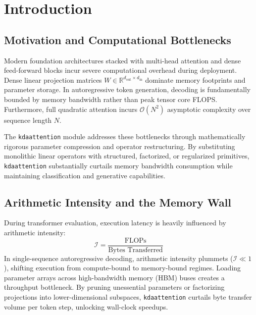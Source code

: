 \section{Introduction}

\subsection{Motivation and Computational Bottlenecks}
Modern foundation architectures stacked with multi-head attention and dense feed-forward blocks incur severe computational overhead during deployment. Dense linear projection matrices $W \in \mathbb{R}^{d_{\text{out}} \times d_{\text{in}}}$ dominate memory footprints and parameter storage. In autoregressive token generation, decoding is fundamentally bounded by memory bandwidth rather than peak tensor core FLOPS. Furthermore, full quadratic attention incurs $\mathcal{O}(N^2)$ asymptotic complexity over sequence length $N$.

The \texttt{kdaattention} module addresses these bottlenecks through mathematically rigorous parameter compression and operator restructuring. By substituting monolithic linear operators with structured, factorized, or regularized primitives, \texttt{kdaattention} substantially curtails memory bandwidth consumption while maintaining classification and generative capabilities.

\subsection{Arithmetic Intensity and the Memory Wall}
During transformer evaluation, execution latency is heavily influenced by arithmetic intensity:
\[
\mathcal{I} = \frac{\text{FLOPs}}{\text{Bytes Transferred}}
\]
In single-sequence autoregressive decoding, arithmetic intensity plummets ($\mathcal{I} \ll 1$), shifting execution from compute-bound to memory-bound regimes. Loading parameter arrays across high-bandwidth memory (HBM) buses creates a throughput bottleneck. By pruning unessential parameters or factorizing projections into lower-dimensional subspaces, \texttt{kdaattention} curtails byte transfer volume per token step, unlocking wall-clock speedups.

